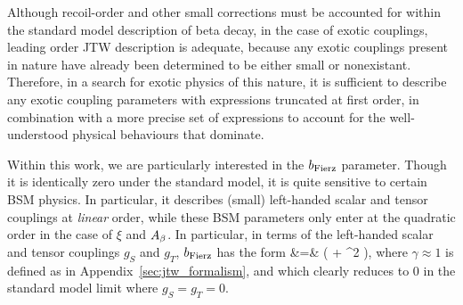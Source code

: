 Although recoil-order and other small corrections must be accounted for within the standard model description of beta decay, in the case of exotic couplings, leading order \ac{JTW} description is adequate, because any exotic couplings present in nature have already been determined to be either small or nonexistant.  Therefore, in a search for exotic physics of this nature, it is sufficient to describe any exotic coupling parameters with expressions truncated at first order, in combination with a more precise set of expressions to account for the well-understood physical behaviours that dominate.  

Within this work, we are particularly interested in the $b_{\mathrm{Fierz}}$ parameter.  Though it is identically zero under the standard model, it is quite sensitive to certain \ac{BSM} physics.  In particular, it describes (small) left-handed scalar and tensor couplings at \emph{linear} order, while these \ac{BSM} parameters only enter at the quadratic order in the case of $\xi$ and $A_{\beta}$.  In particular, in terms of the left-handed scalar and tensor couplings $g_S$ and $g_T$, $b_{\mathrm{Fierz}}$ has the form 
\bea
\bFierz &=&  \left(  + \rho^2  \right), 
\eea
where $\gamma \approx 1$ is defined as in Appendix~\ref{sec:jtw_formalism}, and
which clearly reduces to 0 in the standard model limit where $g_S = g_T = 0$.








